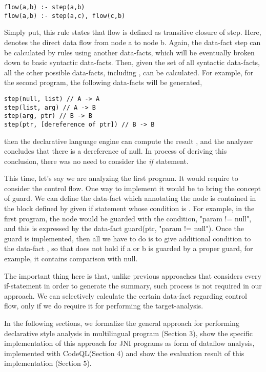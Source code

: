 \begin{lstlisting}[style=myDatalog,xleftmargin=2.5em]
flow(a,b) :- step(a,b)
flow(a,b) :- step(a,c), flow(c,b)
\end{lstlisting}

Simply put, this rule states that flow is defined as transitive closure of
step.  Here,  denotes the direct data flow from node a to
node b. Again, the data-fact step can be calculated by rules using another
data-facts, which will be eventually broken down to basic syntactic data-facts.
Then, given the set of all syntactic data-facts, all the other possible
data-facts, including , can be calculated. For example, for the second
program, the following data-facts will be generated,

\begin{lstlisting}[style=myDatalog,xleftmargin=2.5em]
step(null, list) // A -> A
step(list, arg) // A -> B
step(arg, ptr) // B -> B
step(ptr, [dereference of ptr]) // B -> B
\end{lstlisting}

then the declarative language engine can compute the result , and the analyzer concludes that there is a dereference
of null. In process of deriving this conclusion, there was no need to consider
the \textit{if} statement.

This time, let's say we are analyzing the first program. It would require to
consider the control flow.  One way to implement it would be to bring the
concept of guard. We can define the data-fact  which
annotating the node is contained in the block defined by given if statement
whose condition is .  For example, in the first program, the
 node would be guarded with the condition, "param != null", and
this is expressed by the data-fact guard(ptr, "param != null").  Once the guard
is implemented, then all we have to do is to give additional condition to the
data-fact , so that  does not hold if a or b
is guarded by a proper guard, for example, it contains comparison with null.

The important thing here is that, unlike previous approaches that considers
every if-statement in order to generate the summary, such process is not
required in our approach. We can selectively calculate the certain data-fact
regarding control flow, only if we do require it for performing the
target-analysis.

In the following sections, we formalize the general approach for performing
declarative style analysis in multilingual program (Section 3), show the
specific implementation of this approach for JNI programs as form of dataflow
analysis, implemented with CodeQL(Section 4) and show the evaluation result of
this implementation (Section 5).
